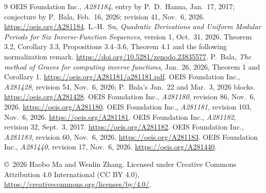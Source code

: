 \documentclass[11pt]{article}
\begin{document}
\begin{thebibliography}{9}
 OEIS Foundation Inc., \emph{A281184}, entry by P.~D.~Hanna,
Jan.~17, 2017; conjecture by P.~Bala, Feb.~16, 2026; revision 41,
Nov.~6, 2026. \url{https://oeis.org/A281184}.
 L.-H.~Su, \emph{Quadratic Derivations and Uniform Modular
Periods for Six Inverse-Function Sequences}, version 1, Oct.~31, 2026.
Theorem 3.2, Corollary 3.3, Propositions 3.4--3.6, Theorem 4.1 and
the following normalization remark.
\url{https://doi.org/10.5281/zenodo.23835577}.
 P.~Bala, \emph{The method of Graves for computing inverse
functions}, Jan.~26, 2026, Theorem 1 and Corollary 1.
\url{https://oeis.org/A281181/a281181.pdf}.
 OEIS Foundation Inc., \emph{A281428}, revision 54,
Nov.~6, 2026; P.~Bala's Jan.~22 and Mar.~3, 2026 blocks.
\url{https://oeis.org/A281428}.
 OEIS Foundation Inc., \emph{A281180}, revision 86,
Nov.~6, 2026. \url{https://oeis.org/A281180}.
 OEIS Foundation Inc., \emph{A281181}, revision 103,
Nov.~6, 2026. \url{https://oeis.org/A281181}.
 OEIS Foundation Inc., \emph{A281182}, revision 32,
Sept.~3, 2017. \url{https://oeis.org/A281182}.
 OEIS Foundation Inc., \emph{A281183}, revision 60,
Nov.~6, 2026. \url{https://oeis.org/A281183}.
 OEIS Foundation Inc., \emph{A281440}, revision 17,
Nov.~6, 2026. \url{https://oeis.org/A281440}.
\end{thebibliography}
\medskip\noindent\small
\copyright\ 2026 Haobo Ma and Wenlin Zhang.
Licensed under Creative Commons Attribution 4.0 International
(CC BY 4.0), \url{https://creativecommons.org/licenses/by/4.0/}.
\end{document}
